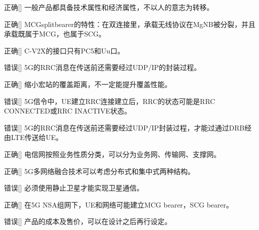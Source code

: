 \begin{choice}{\;正确\;}[]
    一般产品都具备技术属性和经济属性，不以人的意志为转移。

\end{choice}


\begin{choice}{\;正确\;}[]
    MCG\;split\;bearer的特性：在双连接里，承载无线协议在MgNB被分裂，并且承载既属于MCG，也属于SCG。

\end{choice}


\begin{choice}{\;正确\;}[]
    C-V2X的接口只有PC5和Uu口。

\end{choice}

\begin{choice}{\;错误\;}[]
    5G的RRC消息在传送前还需要经过UDP/IP的封装过程。

\end{choice}


\begin{choice}{\;正确\;}[]
    缩小宏站的覆盖距离，不一定能提升覆盖性能。

\end{choice}

\begin{choice}{\;错误\;}[]
    5G信令中，UE建立RRC连接建立后，RRC的状态可能是RRC CONNECTED或RRC INACTIVE状态。

\end{choice}

\begin{choice}{\;错误\;}[]
    5G的RRC消息在传送前还需要经过UDP/IP封装过程，才能过通过DRB经由LTE传送给UE。

\end{choice}

\begin{choice}{\;正确\;}[]
    电信网按照业务性质分类，可以分为业务网、传输网、支撑网。

\end{choice}

\begin{choice}{\;正确\;}[]
    5G多网络融合技术可以考虑分布式和集中式两种结构。

\end{choice}

\begin{choice}{\;错误\;}[]
    必须使用静止卫星才能实现卫星通信。

\end{choice}

\begin{choice}{\;正确\;}[]
    在5G NSA组网下，UE和网络可能建立MCG bearer，SCG bearer。

\end{choice}

\begin{choice}{\;错误\;}[]
    产品的成本及售价，可以在设计之后再行设定。

\end{choice}






